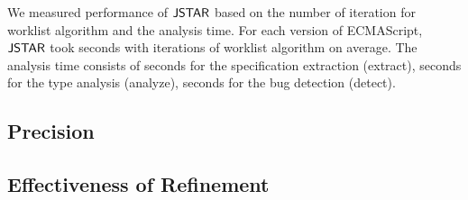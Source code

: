 We measured performance of $\tool$ based on the number of iteration for worklist
algorithm and the analysis time.  For each version of ECMAScript, $\tool$ took
 seconds with  iterations of worklist algorithm on
average.  The analysis time consists of  seconds for the
specification extraction (\textsf{extract}),  seconds for the type
analysis (\textsf{analyze}),  seconds for the bug detection
(\textsf{detect}).


\subsection{Precision}

\begin{table}
  \centering
  \caption{The creaters and resolvers of true bugs.}
  \label{fig:author}
\end{table}


\subsection{Effectiveness of Refinement}


